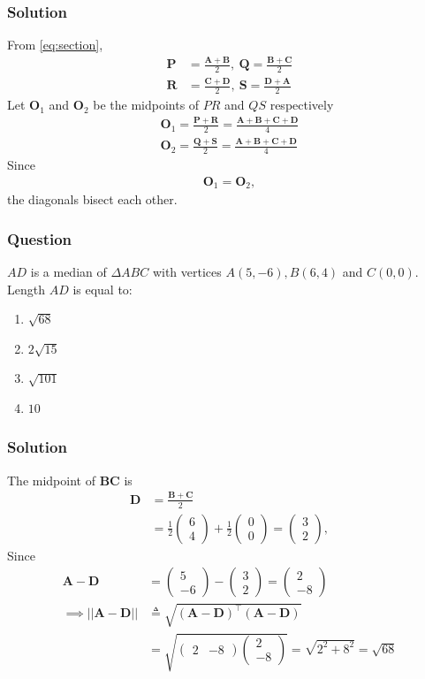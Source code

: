\documentclass{beamer}
\providecommand{\brak}[1]{\ensuremath{\left(#1\right)}}
\theoremstyle{remark}
\newcommand{\myvec}[1]{\ensuremath{\begin{pmatrix}#1\end{pmatrix}}}
\let\vec\mathbf
\begin{document}
%
\begin{frame}
\frametitle{Solution}
	From \eqref{eq:section},
\begin{align}
    \vec{P}&=\frac{\vec{A}+\vec{B}}{2},\
        \vec{Q}=\frac{\vec{B}+\vec{C}}{2}\\
    \vec{R}&=\frac{\vec{C}+\vec{D}}{2},\
    \vec{S}=\frac{\vec{D}+\vec{A}}{2}
    \end{align}
Let $\vec{O}_1$ and $\vec{O}_2$ be the midpoints of $PR$ and $QS$ respectively
\begin{align}
    \vec{O}_1 = \frac{\vec{P}+\vec{R}}{2}=\frac{\vec{A}+\vec{B}+\vec{C}+\vec{D}}{4}\\
      \vec{O}_2 = \frac{\vec{Q}+\vec{S}}{2}=\frac{\vec{A}+\vec{B}+\vec{C}+\vec{D}}{4}
\end{align}
Since 
\begin{align}
    \vec{O}_1     = \vec{O}_2,
\end{align}
 the diagonals bisect each other. 
\end{frame}
%
\begin{frame}
\frametitle{Question }
$AD$ is a median of $\Delta ABC$ with vertices $A\brak{5,-6}, B\brak{6,4}$ and $C\brak{0,0}$. Length $AD$ is equal to:
\begin{enumerate}
\item  $\sqrt{68}$
\item  $2\sqrt{15}$
\item  $\sqrt{101}$
\item  $10$
\end{enumerate}
\end{frame}
\begin{frame}
\frametitle{Solution}
The midpoint of $\vec{BC}$ is 
\begin{align}
    \vec{D} &= \frac{\vec{B} + \vec{C}}{2}\\
    &=\frac{1}{2}\myvec{
        6\\
        4
    }
    +
   \frac{1}{2} \myvec{
        0\\
        0
    } = \myvec{
        3\\
        2
    },
\end{align}
Since
\begin{align}
\vec{A}-\vec{D} &= \myvec{
        5\\
        -6
    }-\myvec{
        3\\
        2
    }=
    \myvec{
        2\\
        -8
    }
\\    \implies \lvert\lvert \vec{A}-\vec{D} \rvert\rvert &\triangleq \sqrt{\brak{\vec{A}-\vec{D}}^\top\brak{\vec{A}-\vec{D}}} \label{9}\\
    &= \sqrt{\myvec{
        2 & -8 
    }
    \myvec{
        2\\
        -8
    }}
    = \sqrt{2^2+8^2} =\sqrt{68} 
\end{align}
\end{frame}
\end{document}
